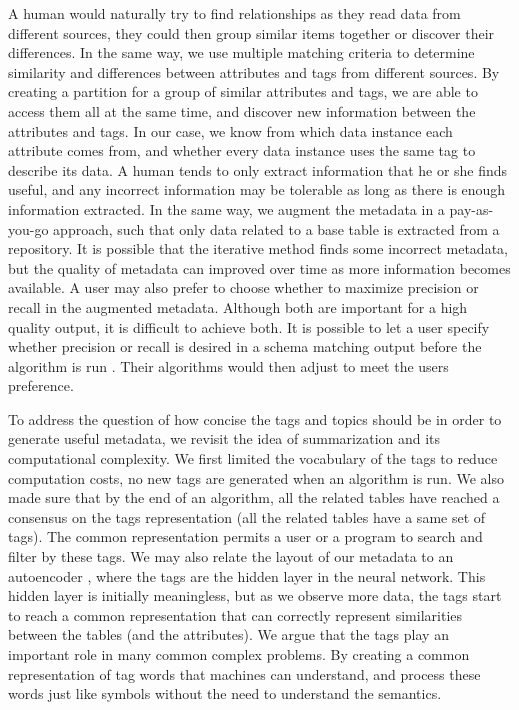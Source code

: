 A human would naturally try to find relationships as they read data from different sources, they could then group similar items together or discover their differences. In the same way, we use multiple matching criteria to determine similarity and differences between attributes and tags from different sources. By creating a partition for a group of similar attributes and tags, we are able to access them all at the same time, and discover new information between the attributes and tags. In our case, we know from which data instance each attribute comes from, and whether every data instance uses the same tag to describe its data. A human tends to only extract information that he or she finds useful, and any incorrect information may be tolerable as long as there is enough information extracted. In the same way, we augment the metadata in a pay-as-you-go approach, such that only data related to a base table is extracted from a repository. It is possible that the iterative method finds some incorrect metadata, but the quality of metadata can improved over time as more information becomes available. A user may also prefer to choose whether to maximize precision or recall in the augmented metadata. Although both are important for a high quality output, it is difficult to achieve both. It is possible to let a user specify whether precision or recall is desired in a schema matching output before the algorithm is run \cite{Duchateau2009YAM}. Their algorithms would then adjust to meet the users preference.

To address the question of how concise the tags and topics should be in order to generate useful metadata, we revisit the idea of summarization and its computational complexity. We first limited the vocabulary of the tags to reduce computation costs, no new tags are generated when an algorithm is run. We also made sure that by the end of an algorithm, all the related tables have reached a consensus on the tags representation (all the related tables have a same set of tags). The common representation permits a user or a program to search and filter by these tags. We may also relate the layout of our metadata to an autoencoder \cite{kipf2017semisupervised}, where the tags are the hidden layer in the neural network. This hidden layer is initially meaningless, but as we observe more data, the tags start to reach a common representation that can correctly represent similarities between the tables (and the attributes). We argue that the tags play an important role in many common complex problems. By creating a common representation of tag words that machines can understand, and process these words just like symbols without the need to understand the semantics.

